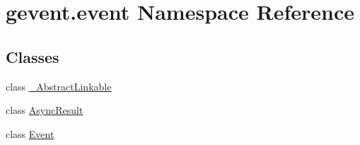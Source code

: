 \hypertarget{namespacegevent_1_1event}{}\section{gevent.\+event Namespace Reference}
\label{namespacegevent_1_1event}
\subsection*{Classes}
\begin{DoxyCompactItemize}
\item 
class \hyperlink{classgevent_1_1event_1_1___abstract_linkable}{\+\_\+\+Abstract\+Linkable}
\item 
class \hyperlink{classgevent_1_1event_1_1_async_result}{Async\+Result}
\item 
class \hyperlink{classgevent_1_1event_1_1_event}{Event}
\end{DoxyCompactItemize}
